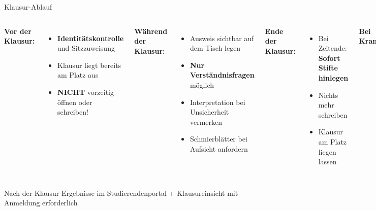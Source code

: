 \begin{frame}{Klausur-Ablauf}
  \begin{columns}[T]
    \textbf{Vor der Klausur:}
    \begin{itemize}
      \item \textbf{Identitätskontrolle} und Sitzzuweisung
      \item Klausur liegt bereits am Platz aus
      \item \textbf{NICHT} vorzeitig öffnen oder schreiben!
    \end{itemize}

    \textbf{Während der Klausur:}
    \begin{itemize}
      \item Ausweis sichtbar auf dem Tisch legen
      \item \textbf{Nur Verständnisfragen} möglich
      \item Interpretation bei Unsicherheit vermerken
      \item Schmierblätter bei Aufsicht anfordern
    \end{itemize}

    \textbf{Ende der Klausur:}
    \begin{itemize}
      \item Bei Zeitende: \textbf{Sofort Stifte hinlegen}
      \item Nichts mehr schreiben
      \item Klausur am Platz liegen lassen
    \end{itemize}

    \textbf{Bei Krankheit:}
    \begin{itemize}
      \item Einfach \textbf{nicht erscheinen} - kein Fehlversuch
      \item Während Klausur: Abbruch explizit melden
      \item \textbf{Nicht} regulär abgeben
      \item Ich wiederhole: \textbf{Niemals unterschreiben!!!!!}
    \end{itemize}
  \end{columns}

  \vspace{0.25cm}

  \begin{exampleblock}{Nach der Klausur}
    Ergebnisse im Studierendenportal + Klausureinsicht mit Anmeldung erforderlich
  \end{exampleblock}
\end{frame}
